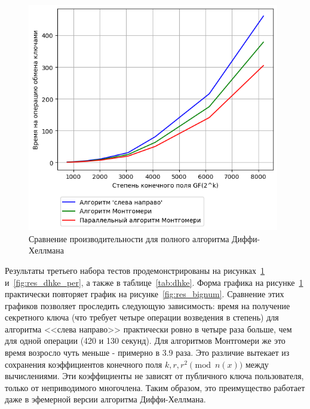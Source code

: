 \documentclass[times,specification,annotation]{itmo-student-thesis}
\begin{document}
\begin{figure}[!h]
\caption{Сравнение производительности для полного алгоритма Диффи-Хеллмана}\label{fig:res_dhke}
\includegraphics[width=11cm]{graphics/results_dhke_ru.png}
\end{figure}

Результаты третьего набора тестов продемонстрированы на рисунках~\ref{fig:res_dhke} и~\ref{fig:res_dhke_per},
а также в таблице~\ref{tab:dhke}.
Форма графика на рисунке~\ref{fig:res_dhke} практически повторяет график на рисунке~\ref{fig:res_bignum}.
Сравнение этих графиков позволяет проследить следующую зависимость: время на получение секретного ключа (что
требует четыре операции возведения в степень) для алгоритма <<слева направо>> практически ровно в четыре раза
больше, чем для одной операции (420 и 130 секунд).
Для алгоритмов Монтгомери же это время возросло чуть меньше - примерно в 3.9 раза.
Это различие вытекает из сохранения коэффициентов конечного поля $k, r, r^2 \pmod{n(x)}$ между вычислениями.
Эти коэффициенты не зависят от публичного ключа пользователя, только от неприводимого многочлена.
Таким образом, это преимущество работает даже в эфемерной версии алгоритма Диффи-Хеллмана.
\end{document}
